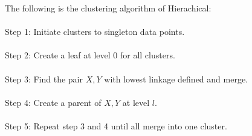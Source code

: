 \documentclass{article}
\begin{document}
The following is the clustering algorithm of Hierachical:
\paragraph{}
Step 1: Initiate clusters to singleton data points.
\paragraph{}
Step 2: Create a leaf at level 0 for all clusters.
\paragraph{}
Step 3: Find the pair $X, Y$ with lowest linkage defined and merge.
\paragraph{}
Step 4: Create a parent of $X, Y$ at level $l$.
\paragraph{}
Step 5: Repeat step 3 and 4 until all merge into one cluster.
\end{document}
